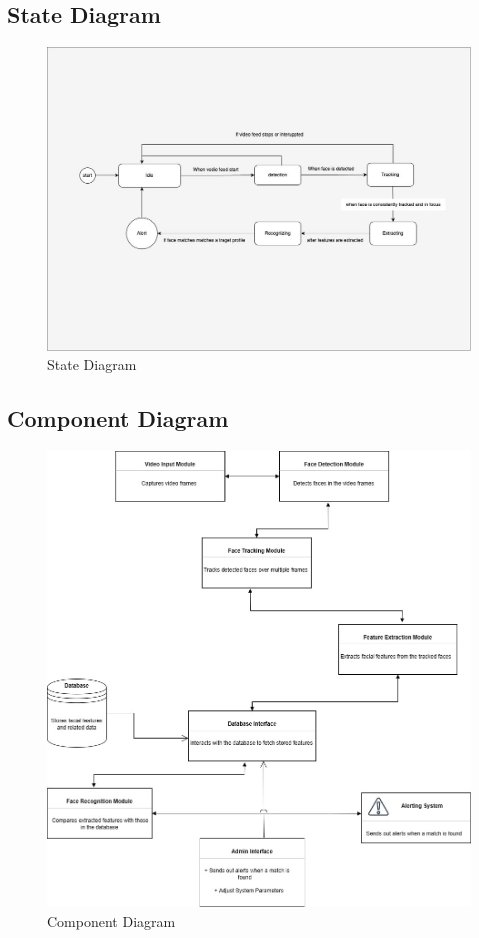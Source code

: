 	\pagebreak

	\subsection{State Diagram}
		\begin{figure}[h!]
			\includegraphics[width=\textwidth]{components/images/state.jpg}
			\caption{State Diagram}
			\label{fig:state}
		\end{figure}

	\pagebreak

	\subsection{Component Diagram}
		\begin{figure}[h!]
			\includegraphics[width=\textwidth]{components/images/component.jpg}
			\caption{Component Diagram}
			\label{fig:component}
		\end{figure}

